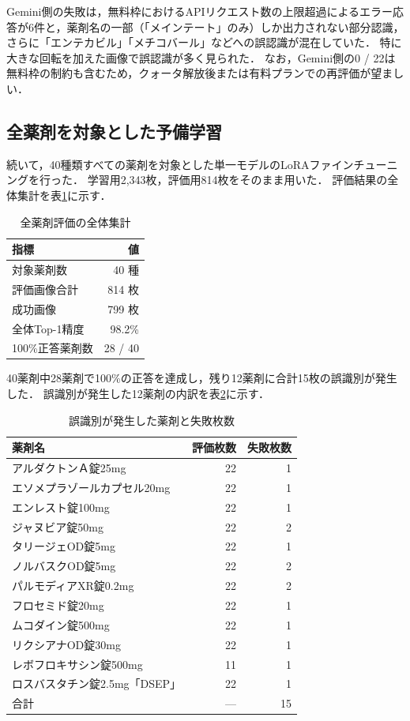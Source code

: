 \documentclass{jsarticle}
\begin{document}
Gemini側の失敗は，無料枠におけるAPIリクエスト数の上限超過によるエラー応答が6件と，薬剤名の一部（「メインテート」のみ）しか出力されない部分認識，さらに「エンテカビル」「メチコバール」などへの誤認識が混在していた．
特に大きな回転を加えた画像で誤認識が多く見られた．
なお，Gemini側の0 / 22は無料枠の制約も含むため，クォータ解放後または有料プランでの再評価が望ましい．

\subsection{全薬剤を対象とした予備学習}

続いて，40種類すべての薬剤を対象とした単一モデルのLoRAファインチューニングを行った．
学習用2,343枚，評価用814枚をそのまま用いた．
評価結果の全体集計を表\ref{tab:all_drugs_summary}に示す．

\begin{table}[h]
\centering
\caption{全薬剤評価の全体集計}
\label{tab:all_drugs_summary}
\begin{tabular}{lr}
\hline
指標 & 値 \\
\hline
対象薬剤数 & 40 種 \\
評価画像合計 & 814 枚 \\
成功画像 & 799 枚 \\
全体Top-1精度 & 98.2\% \\
100\%正答薬剤数 & 28 / 40 \\
\hline
\end{tabular}
\end{table}

40薬剤中28薬剤で100\%の正答を達成し，残り12薬剤に合計15枚の誤識別が発生した．
誤識別が発生した12薬剤の内訳を表\ref{tab:failed_drugs}に示す．

\begin{table}[h]
\centering
\caption{誤識別が発生した薬剤と失敗枚数}
\label{tab:failed_drugs}
\small
\begin{tabular}{lrr}
\hline
薬剤名 & 評価枚数 & 失敗枚数 \\
\hline
アルダクトンＡ錠25mg & 22 & 1 \\
エソメプラゾールカプセル20mg & 22 & 1 \\
エンレスト錠100mg & 22 & 1 \\
ジャヌビア錠50mg & 22 & 2 \\
タリージェOD錠5mg & 22 & 1 \\
ノルバスクOD錠5mg & 22 & 2 \\
パルモディアXR錠0.2mg & 22 & 2 \\
フロセミド錠20mg & 22 & 1 \\
ムコダイン錠500mg & 22 & 1 \\
リクシアナOD錠30mg & 22 & 1 \\
レボフロキサシン錠500mg & 11 & 1 \\
ロスバスタチン錠2.5mg「DSEP」 & 22 & 1 \\
\hline
合計 & --- & 15 \\
\hline
\end{tabular}
\end{table}
\end{document}
